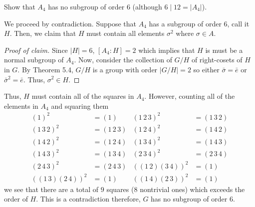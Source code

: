 \begin{problem}
  Show that $A_4$ has no subgroup of order $6$ (although $6\mid 12=|A_4|$).
\end{problem}
\begin{solution}
  We proceed by contradiction. Suppose that $A_4$ has a subgroup of order
  $6$, call it $H$. Then, we claim that $H$ must contain all elements
  $\sigma^2$ where $\sigma\in A$.
  \begin{proof}[Proof of claim]
    \renewcommand\qedsymbol{$\clubsuit$}%
    Since $|H|=6$, $[A_4:H]=2$ which implies that $H$ is must be a normal
    subgroup of $A_4$. Now, consider the collection of $G/H$ of
    right-cosets of $H$ in $G$. By Theorem 5.4, $G/H$ is a group with order
    $|G/H|=2$ so either $\bar\sigma=\bar e$ or ${\bar\sigma}^2=\bar
    e$. Thus, $\sigma^2\in H$.
  \end{proof}
  Thus, $H$ must contain all of the squares in $A_4$. However, counting all
  of the elements in $A_4$ and squaring them
  \begin{align*}
    (1)^2&=(1)
    &(1\,2\,3)^2&=(1\,3\,2)
    \\
    (1\,3\,2)^2&=(1\,2\,3)
    &(1\,2\,4)^2&=(1\,4\,2)\\
    (1\,4\,2)^2&=(1\,2\,4)
    &(1\,3\,4)^2&=(1\,4\,3)\\
    (1\,4\,3)^2&=(1\,3\,4)
    &(2\,3\,4)^2&=(2\,3\,4)\\
    (2\,4\,3)^2&=(2\,4\,3)
    &((1\,2)(3\,4))^2
             &=(1)\\
    ((1\,3)(2\,4))^2&=(1)&
    ((1\,4)(2\,3))^2&=(1)
  \end{align*}
  we see that there are a total of $9$ squares ($8$ nontrivial ones) which
  exceeds the order of $H$. This is a contradiction therefore, $G$ has no
  subgroup of order $6$.
\end{solution}

